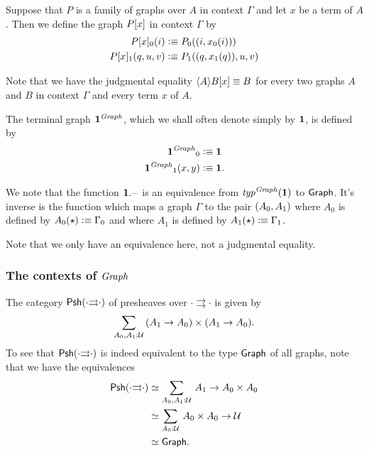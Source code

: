 \begin{defn}
Suppose that $P$ is a family of graphs over $A$ in context $\Gamma$ and let
$x$ be a term of $A$. Then we define the graph $\subst{x}{P}$ 
in context $\Gamma$ by
\begin{align*}
\subst{x}{P}_0(i) & \defeq P_0(\pairr{i,x_0(i)})\\
\subst{x}{P}_1(q,u,v) & \defeq P_1(\pairr{q,x_1(q)},u,v)
\end{align*}
\end{defn}

\begin{rmk}
Note that we have the judgmental equality $\subst{x}{\ctxwk{A}{B}}\jdeq B$
for every two graphs $A$ and $B$ in context $\Gamma$ and every term $x$ of $A$.
\end{rmk}

\begin{defn}
The terminal graph $\mathbf{1}^\mathit{Graph}$, which we shall often denote simply 
by $\mathbf{1}$, is defined by
\begin{align*}
{\unit^\mfGraph}_0 & \defeq \unit\\
{\unit^\mfGraph}_1(x,y) & \defeq \unit.
\end{align*}
\end{defn}

\begin{rmk}
We note that the function $\ctxext{\unit}{\blank}$ is an equivalence
from ${{\mathit{typ}^{\mathit{Graph}}}(\mathbf{1})}$ to $\mathsf{Graph}$. It's inverse is the function which maps
a graph $\Gamma$ to the pair ${\mathopen{}(A_0,A_1)\mathclose{}}$ where $A_0$ is defined by
$A_0(\star)\vcentcolon\equiv\Gamma_0$ and where $A_1$ is defined by $A_1(\star)\vcentcolon\equiv
\Gamma_1$. 

Note that we only have an equivalence here, not a judgmental equality.
\end{rmk}

\subsubsection{The contexts of $\mathit{Graph}$}


The category $\mathsf{Psh}(\cdot{\rightrightarrows}\cdot)$ of presheaves over
$\cdot{\rightrightarrows}\cdot$ is given by
\begin{equation*}
\sm{A_0,A_1:\type}(A_1\to A_0)\times(A_1\to A_0).
\end{equation*}
To see that $\mathsf{Psh}(\cdot{\rightrightarrows}\cdot)$ is indeed equivalent to
the type $\mathsf{Graph}$ of all graphs, note that we have the equivalences
\begin{align*}
\psh(\cdot{\rightrightarrows}\cdot) & \eqvsym \sm{A_0,A_1:\type}A_1\to A_0\times A_0\\
& \eqvsym \sm{A_0:\type} A_0\times A_0\to\type\\
& \eqvsym \tfGraph.
\end{align*}

